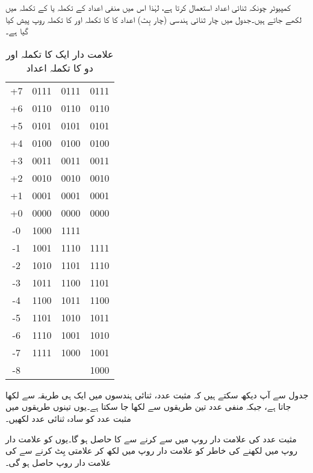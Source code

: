  کمپیوٹر چونکہ ثنائی اعداد استعمال کرتا ہے، لہٰذا اس میں منفی اعداد  کے تکملہ یا  کے تکملہ میں لکھے جاتے ہیں۔جدول  میں چار ثنائی ہندسی (چار بِٹ)   اعداد کا  کا تکملہ اور  کا تکملہ روپ پیش کیا گیا ہے۔
\begin{table}
\caption{علامت دار ایک کا تکملہ اور دو کا تکملہ اعداد}
\label{جدول_حساب_علامت_دار_تکملہ_ایک_دو}
\centering
\begin{tabular}{CCCC}
\toprule
{} &  &  & \\
\midrule
+7&0111&0111&0111\\
+6&0110&0110&0110\\
+5&0101&0101&0101\\
+4&0100&0100&0100\\[0.5em]
+3&0011&0011&0011\\
+2&0010&0010&0010\\
+1&0001&0001&0001\\
+0&0000&0000&0000\\[0.5em]
-0&1000&1111&\\
-1&1001&1110&1111\\
-2&1010&1101&1110\\
-3&1011&1100&1101\\[0.5em]
-4&1100&1011&1100\\
-5&1101&1010&1011\\
-6&1110&1001&1010\\
-7&1111&1000&1001\\
-8&&&1000\\
\bottomrule
\end{tabular}
\end{table}

جدول  سے آپ دیکھ سکتے ہیں کہ مثبت عدد، ثنائی ہندسوں میں ایک ہی طریقہ سے لکھا جاتا ہے، جبکہ منفی عدد تین طریقوں سے لکھا جا سکتا ہے۔یوں تینوں طریقوں میں مثبت عدد کو سادہ ثنائی عدد لکھیں۔

	مثبت عدد  کی علامت دار روپ میں   سے  کرنے سے  کا   حاصل ہو گا۔یوں  کو علامت دار روپ میں لکھنے کی خاطر  کو علامت دار روپ  میں لکھ کر علامتی بِٹ  کرنے سے  کی علامت دار روپ  حاصل ہو گی۔
	
